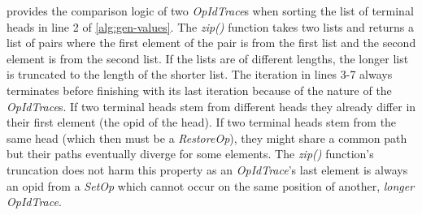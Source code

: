 \documentclass[sigplan]{acmart}
\newcommand{\setopkind}{\textit{SetOp}}
\newcommand{\restopkind}{\textit{RestoreOp}}
\newcommand{\opidtrace}{\textit{OpIdTrace}}
\begin{document}
 provides the comparison logic of two \opidtrace{}s
when sorting the list of terminal heads in line 2 of \cref{alg:gen-values}.
The \textit{zip()} function takes two lists and returns a list of pairs
where the first element of the pair is from the first list and the second
element is from the second list.
If the lists are of different lengths, the longer list is truncated to the
length of the shorter list.
The iteration in lines 3-7 always terminates before finishing with
its last iteration because of the nature of the \opidtrace{}s.
If two terminal heads stem from different heads they already differ in their
first element (the \gls*{opid} of the head).
If two terminal heads stem from the same head (which then must be a \restopkind{}),
they might share a common path but their paths eventually diverge for some elements.
The \textit{zip()} function's truncation does not harm this property
as an \opidtrace{}'s last element is always an \gls*{opid} from a \setopkind{}
which cannot occur on the same position of another, \emph{longer} \opidtrace{}.
\end{document}
